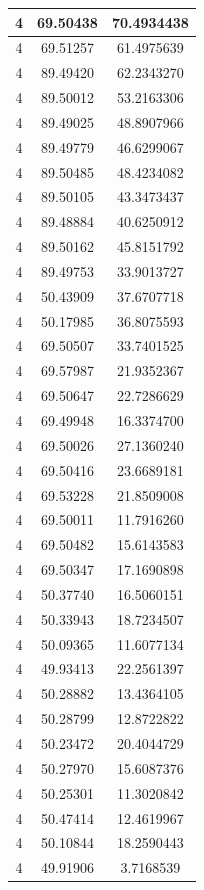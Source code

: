 \documentclass[
]{book}
\begin{document}
\begin{tabular}{c|c|c}
\hline
4 & 69.50438 & 70.4934438\\
\hline
4 & 69.51257 & 61.4975639\\
\hline
4 & 89.49420 & 62.2343270\\
\hline
4 & 89.50012 & 53.2163306\\
\hline
4 & 89.49025 & 48.8907966\\
\hline
4 & 89.49779 & 46.6299067\\
\hline
4 & 89.50485 & 48.4234082\\
\hline
4 & 89.50105 & 43.3473437\\
\hline
4 & 89.48884 & 40.6250912\\
\hline
4 & 89.50162 & 45.8151792\\
\hline
4 & 89.49753 & 33.9013727\\
\hline
4 & 50.43909 & 37.6707718\\
\hline
4 & 50.17985 & 36.8075593\\
\hline
4 & 69.50507 & 33.7401525\\
\hline
4 & 69.57987 & 21.9352367\\
\hline
4 & 69.50647 & 22.7286629\\
\hline
4 & 69.49948 & 16.3374700\\
\hline
4 & 69.50026 & 27.1360240\\
\hline
4 & 69.50416 & 23.6689181\\
\hline
4 & 69.53228 & 21.8509008\\
\hline
4 & 69.50011 & 11.7916260\\
\hline
4 & 69.50482 & 15.6143583\\
\hline
4 & 69.50347 & 17.1690898\\
\hline
4 & 50.37740 & 16.5060151\\
\hline
4 & 50.33943 & 18.7234507\\
\hline
4 & 50.09365 & 11.6077134\\
\hline
4 & 49.93413 & 22.2561397\\
\hline
4 & 50.28882 & 13.4364105\\
\hline
4 & 50.28799 & 12.8722822\\
\hline
4 & 50.23472 & 20.4044729\\
\hline
4 & 50.27970 & 15.6087376\\
\hline
4 & 50.25301 & 11.3020842\\
\hline
4 & 50.47414 & 12.4619967\\
\hline
4 & 50.10844 & 18.2590443\\
\hline
4 & 49.91906 & 3.7168539\\

\end{tabular}
\end{document}
